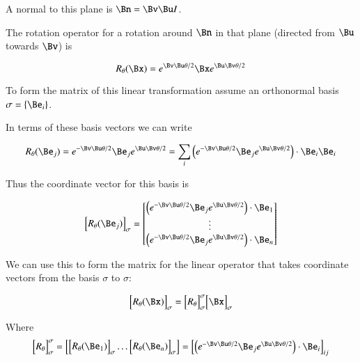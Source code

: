 A normal to this plane is $\Bn = \Bv\Bu I$.

The rotation operator for a rotation around $\Bn$ in that plane (directed from $\Bu$ towards $\Bv$) is

\[
R_\theta(\Bx) = e^{\Bv\Bu \theta/2} \Bx e^{\Bu\Bv \theta/2}
\]

To form the matrix of this linear transformation assume an orthonormal basis $\sigma = \{ \Be_i \}$.

In terms of these basis vectors we can write

\[
R_\theta(\Be_j) = 
e^{-\Bv\Bu \theta/2} \Be_j e^{\Bu\Bv \theta/2}
=
\sum_i \left(e^{-\Bv\Bu \theta/2} \Be_j e^{\Bu\Bv \theta/2}\right) \cdot \Be_i \Be_i
\]

Thus the coordinate vector for this basis is

\[
{
\begin{bmatrix}
R_\theta(\Be_j)
\end{bmatrix}
}_\sigma
=
\begin{bmatrix}
\left(e^{-\Bv\Bu \theta/2} \Be_j e^{\Bu\Bv \theta/2}\right) \cdot \Be_1 \\
\vdots \\
\left(e^{-\Bv\Bu \theta/2} \Be_j e^{\Bu\Bv \theta/2}\right) \cdot \Be_n \\
\end{bmatrix}
\]

We can use this to form the matrix for the linear operator that takes coordinate vectors from
the basis $\sigma$ to $\sigma$:

\[
{
\begin{bmatrix}
R_\theta(\Bx)
\end{bmatrix}
}_\sigma
=
{
\begin{bmatrix}
R_\theta
\end{bmatrix}
}_\sigma^\sigma
{
\begin{bmatrix}
\Bx
\end{bmatrix}
}_\sigma
\]

Where
\begin{equation}\label{eqn:rotor:rotcoords}
{
\begin{bmatrix}
R_\theta
\end{bmatrix}
}_\sigma^\sigma
=
\begin{bmatrix}
{
\begin{bmatrix}
R_\theta(\Be_1)
\end{bmatrix}
}_\sigma
\hdots
{
\begin{bmatrix}
R_\theta(\Be_n)
\end{bmatrix}
}_\sigma
\end{bmatrix}
=
{
\begin{bmatrix}
\left(e^{-\Bv\Bu \theta/2} \Be_j e^{\Bu\Bv \theta/2}\right) \cdot \Be_i \\
\end{bmatrix}
}_{ij}
\end{equation}

